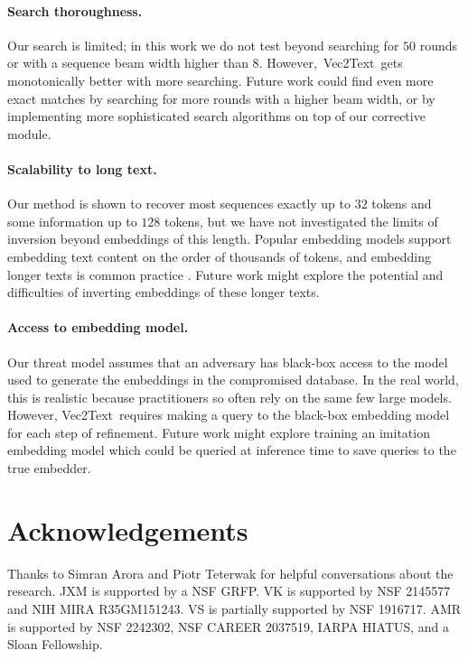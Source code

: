 \documentclass[11pt]{article}
\newcommand{\MethodName}{Vec2Text}
\begin{document}
\paragraph{Search thoroughness.} Our search is limited; in this work we do not test beyond searching for $50$ rounds or with a sequence beam width higher than $8$. However,\ \MethodName\ gets monotonically better with more searching. Future work could find even more exact matches by searching for more rounds with a higher beam width, or by implementing more sophisticated search algorithms on top of our corrective module.

\paragraph{Scalability to long text.} Our method is shown to recover most sequences exactly up to $32$ tokens and some information up to $128$ tokens, but we have not investigated the limits of inversion beyond embeddings of this length. Popular embedding models support embedding text content on the order of thousands of tokens, and embedding longer texts is common practice \cite{thakur2021beir}. Future work might explore the potential and difficulties of inverting embeddings of these longer texts.

\paragraph{Access to embedding model.} Our threat model assumes that an adversary has black-box access to the model used to generate the embeddings in the compromised database. In the real world, this is realistic because practitioners so often rely on the same few large models. However, \MethodName\ requires making a query to the black-box embedding model for each step of refinement. Future work might explore training an imitation embedding model which could be queried at inference time to save queries to the true embedder.

\section{Acknowledgements}

Thanks to Simran Arora and Piotr Teterwak for helpful conversations about the research. JXM is supported by a NSF GRFP. VK is supported by NSF 2145577 and NIH MIRA R35GM151243. VS is partially supported by NSF 1916717. AMR is supported by NSF 2242302, NSF CAREER 2037519, IARPA HIATUS, and a Sloan Fellowship.
\end{document}
